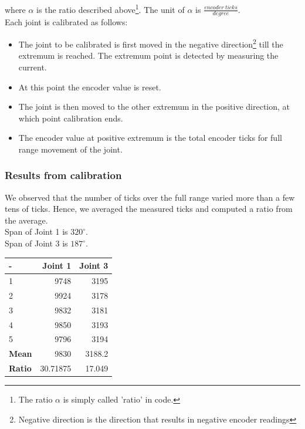 \documentclass[10pt,a4paper]{article}
\begin{document}
where \(\alpha\) is the ratio described above\footnote{The ratio
  \(\alpha\) is simply called 'ratio' in code.}. The unit of
\(\alpha\) is \( \frac{encoder\ ticks}{degree}\). \\


Each joint is calibrated as follows:
\begin{itemize}
\item The joint to be calibrated is first moved in the negative
  direction\footnote{Negative direction is the direction that results
    in negative encoder readings} till the extremum is reached. The
  extremum point is detected by measuring the current.
\item At this point the encoder value is reset. 
\item The joint is then moved to the other extremum in the positive
  direction, at which point calibration ends.
\item The encoder value at positive extremum is the total encoder
  ticks for full range movement of the joint.
\end{itemize}

\subsubsection{Results from calibration}

We observed that the number of ticks over the full range varied more
than a few tens of ticks. Hence, we averaged the measured ticks and
computed a ratio from the average. \\ 
Span of Joint 1 is \(320^{\circ}\).\\
Span of Joint 3 is \(187^{\circ}\).\\

\begin{tabular}{ | l | r | r |}
\hline
- & \textbf{Joint 1} & \textbf{Joint 3} \\
\hline
1 & 9748 & 3195 \\
\hline
2 & 9924 & 3178 \\
\hline
3 & 9832 & 3181 \\
\hline
4 & 9850 & 3193 \\
\hline
5 & 9796 & 3194 \\
\hline
\textbf{Mean} & 9830 & 3188.2 \\
\hline
\textbf{Ratio} & 30.71875 & 17.049 \\
\hline

\end{tabular}
\end{document}
